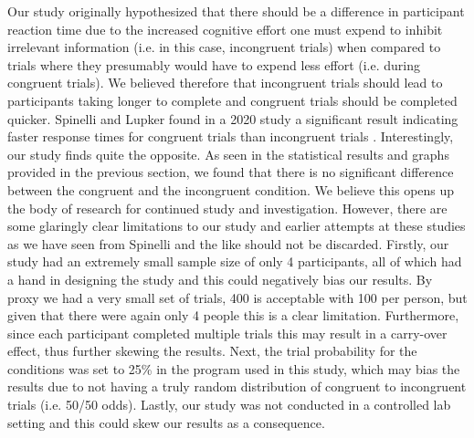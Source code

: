 \documentclass{article}
\begin{document}
\hspace{1em} Our study originally hypothesized that there should be a difference in participant reaction time due to the increased cognitive effort one must expend to inhibit irrelevant information (i.e. in this case, incongruent trials) when compared to trials where they presumably would have to expend less effort (i.e. during congruent trials). We believed therefore that incongruent trials should lead to participants taking longer to complete and congruent trials should be completed quicker. Spinelli and Lupker found in a 2020 study a significant result indicating faster response times for congruent trials than incongruent trials \cite{SpinelliGiacomo2020I}. Interestingly, our study finds quite the opposite. As seen in the statistical results and graphs provided in the previous section, we found that there is no significant difference between the congruent and the incongruent condition. We believe this opens up the body of research for continued study and investigation. However, there are some glaringly clear limitations to our study and earlier attempts at these studies as we have seen from Spinelli and the like should not be discarded. Firstly, our study had an extremely small sample size of only 4 participants, all of which had a hand in designing the study and this could negatively bias our results. By proxy we had a very small set of trials, 400 is acceptable with 100 per person, but given that there were again only 4 people this is a clear limitation. Furthermore, since each participant completed multiple trials this may result in a carry-over effect, thus further skewing the results. Next, the trial probability for the conditions was set to 25\% in the program used in this study, which may bias the results due to not having a truly random distribution of congruent to incongruent trials (i.e. 50/50 odds). Lastly, our study was not conducted in a controlled lab setting and this could skew our results as a consequence. 


\end{document}
